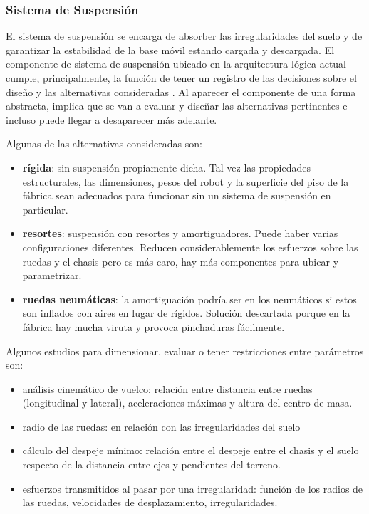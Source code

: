 
\pagebreak
\subsubsection{Sistema de Suspensión}
El sistema de suspensión se encarga de absorber las irregularidades del suelo y de garantizar la estabilidad de la base móvil estando cargada y descargada. El componente de sistema de suspensión ubicado en la arquitectura lógica actual cumple, principalmente, la función de tener un registro de las decisiones sobre el diseño y las alternativas consideradas \cite{lo_needs_2012, couturier_tracking_2014}. Al aparecer el componente de una forma abstracta, implica que se van a evaluar y diseñar las alternativas pertinentes e incluso puede llegar a desaparecer más adelante.

Algunas de las alternativas consideradas son:
\begin{itemize}
	\item \textbf{rígida}: sin suspensión propiamente dicha. Tal vez las propiedades estructurales, las dimensiones, pesos del robot y la superficie del piso de la fábrica sean adecuados para funcionar sin un sistema de suspensión en particular.
	\item \textbf{resortes}: suspensión con resortes y amortiguadores. Puede haber varias configuraciones diferentes. Reducen considerablemente los esfuerzos sobre las ruedas y el chasis pero es más caro, hay más componentes para ubicar y parametrizar.
	\item \textbf{ruedas neumáticas}: la amortiguación podría ser en los neumáticos si estos son inflados con aires en lugar de rígidos. Solución descartada porque en la fábrica hay mucha viruta y provoca pinchaduras fácilmente.
\end{itemize}

Algunos estudios para dimensionar, evaluar o tener restricciones entre parámetros son:
\begin{itemize}
	\item análisis cinemático de vuelco: relación entre distancia entre ruedas (longitudinal y lateral), aceleraciones máximas y altura del centro de masa.
	\item radio de las ruedas: en relación con las irregularidades del suelo
	\item cálculo del despeje mínimo: relación entre el despeje entre el chasis y el suelo respecto de la distancia entre ejes y pendientes del terreno.
	\item esfuerzos transmitidos al pasar por una irregularidad: función de los radios de las ruedas, velocidades de desplazamiento, irregularidades.
\end{itemize}

